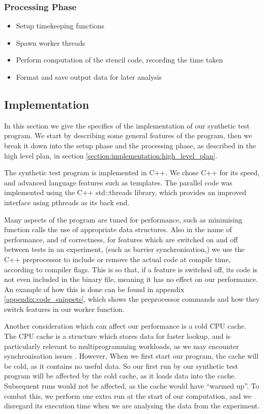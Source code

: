 \subsubsection{Processing Phase}
\label{section:implementation:procesing_phase}

\begin{itemize}
    \item Setup timekeeping functions
    \item Spawn worker threads
    \item Perform computation of the stencil code, recording the time taken
    \item Format and save output data for later analysis
\end{itemize}



\subsection{Implementation}
\label{section:implementation:implementation}

In this section we give the specifics of the implementation of our synthetic test program. We start by describing some general features of the program, then we break it down into the setup phase and the processing phase, as described in the high level plan, in section \ref{section:implementation:high_level_plan}.

The synthetic test program is implemented in C++. We chose C++ for its speed, and advanced language features such as templates. The parallel code was implemented using the C++ std::threads library, which provides an improved interface using pthreads as its back end.

Many aspects of the program are tuned for performance, such as minimising function calls the use of appropriate data structures. Also in the name of performance, and of correctness, for features which are switched on and off between tests in an experiment, (such as barrier synchronisation,) we use the C++ preprocessor to include or remove the actual code at compile time, according to compiler flags. This is so that, if a feature is switched off, its code is not even included in the binary file, meaning it has no effect on our performance. An example of how this is done can be found in appendix \ref{appendix:code_snippets}, which shows the preprocessor commands and how they switch features in our worker function.

Another consideration which can affect our performance is a cold CPU cache. The CPU cache is a structure which stores data for faster lookup, and is particularly relevant to multiprogramming workloads, as we may encounter synchronisation issues \cite{agarwal_hennessy_horowitz_1988}. However, When we first start our program, the cache will be cold, as it contains no useful data. So our first run by our synthetic test program will be affected by the cold cache, as it loads data into the cache. Subsequent runs would not be affected, as the cache would have ``warmed up''. To combat this, we perform one extra run at the start of our computation, and we disregard its execution time when we are analysing the data from the experiment.



